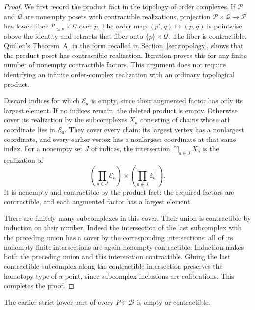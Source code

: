 \begin{proof}
We first record the product fact in the topology of order complexes.
If $\mathcal P$ and $\mathcal Q$ are nonempty posets with contractible
realizations, projection $\mathcal P\times\mathcal Q\to\mathcal P$
has lower fiber $\mathcal P_{\le p}\times\mathcal Q$ over $p$.
The order map $(p',q)\mapsto(p,q)$ is pointwise above the identity and
retracts that fiber onto $\{p\}\times\mathcal Q$.  The fiber is
contractible.  Quillen's Theorem~A, in the form recalled in
Section~\ref{sec:topology}, shows that the product poset has contractible
realization.  Iteration proves this for any finite number of nonempty
contractible factors.  This argument does not require identifying an
infinite order-complex realization with an ordinary topological product.

Discard indices for which $\mathcal E_a$ is empty, since their augmented
factor has only its largest element.  If no indices remain, the deleted
product is empty.  Otherwise cover its realization by the subcomplexes
$X_a$ consisting of chains whose $a$th coordinate lies in
$\mathcal E_a$.  They cover every chain: its largest vertex has a
nonlargest coordinate, and every earlier vertex has a nonlargest
coordinate at that same index.  For a nonempty set $J$ of indices,
the intersection $\bigcap_{a\in J}X_a$ is the realization of
\[
 \left(\prod_{a\in J}\mathcal E_a\right)
        \times
 \left(\prod_{a\notin J}\mathcal E_a^+\right).
\]
It is nonempty and contractible by the product fact: the required
factors are contractible, and each augmented factor has a largest
element.

There are finitely many subcomplexes in this cover.  Their union is
contractible by induction on their number.  Indeed the intersection of
the last subcomplex with the preceding union has a cover by the
corresponding intersections; all of its nonempty finite intersections
are again nonempty contractible.  Induction makes both the preceding
union and this intersection contractible.  Gluing the last
contractible subcomplex along the contractible intersection preserves
the homotopy type of a point, since subcomplex inclusions are
cofibrations.  This completes the proof.
\end{proof}

\begin{proposition}\label{prop:global-lower-link}
The earlier strict lower part of every $P\in\mathcal D$ is empty or
contractible.
\end{proposition}


